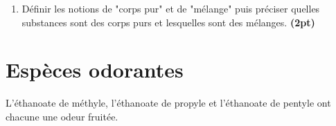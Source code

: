 \documentclass[a4paper,12pt,fleqn]{article}%
\begin{document}
\begin{enumerate}[resume]
	\item Définir les notions de "corps pur" et de "mélange" puis préciser quelles substances sont des corps purs et lesquelles sont des mélanges. \textbf{(2pt)}
\end{enumerate}

\newpage
\section{Espèces odorantes}
L'éthanoate de méthyle, l'éthanoate de propyle et l'éthanoate de pentyle ont chacune une odeur fruitée.
\end{document}
